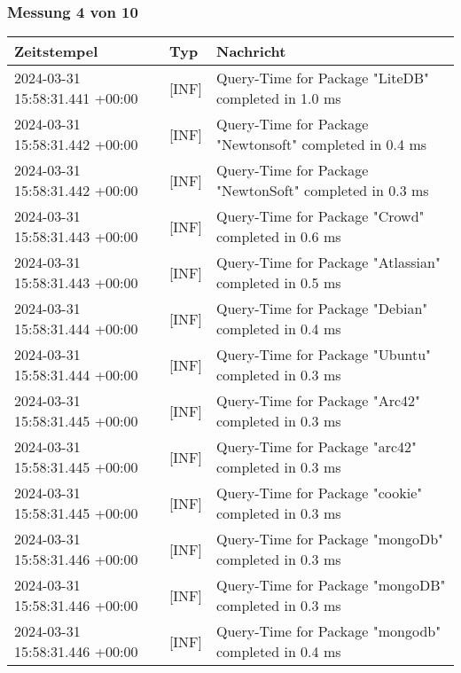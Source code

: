     \subsubsection*{Messung 4 von 10} \label{subsubsec:MySQLMitIndex4von10}
        {
            {\small
                \begin{tabularx}{\textwidth}{|l|l|X|}
                    \hline
                    \textbf{Zeitstempel} & \textbf{Typ} & \textbf{Nachricht} \\
                    \hline
                    \endhead
                    2024-03-31 15:58:31.441 +00:00 & [INF] & Query-Time for Package "LiteDB" completed in 1.0 ms \\
                    2024-03-31 15:58:31.442 +00:00 & [INF] & Query-Time for Package "Newtonsoft" completed in 0.4 ms \\
                    2024-03-31 15:58:31.442 +00:00 & [INF] & Query-Time for Package "NewtonSoft" completed in 0.3 ms \\
                    2024-03-31 15:58:31.443 +00:00 & [INF] & Query-Time for Package "Crowd" completed in 0.6 ms \\
                    2024-03-31 15:58:31.443 +00:00 & [INF] & Query-Time for Package "Atlassian" completed in 0.5 ms \\
                    2024-03-31 15:58:31.444 +00:00 & [INF] & Query-Time for Package "Debian" completed in 0.4 ms \\
                    2024-03-31 15:58:31.444 +00:00 & [INF] & Query-Time for Package "Ubuntu" completed in 0.3 ms \\
                    2024-03-31 15:58:31.445 +00:00 & [INF] & Query-Time for Package "Arc42" completed in 0.3 ms \\
                    2024-03-31 15:58:31.445 +00:00 & [INF] & Query-Time for Package "arc42" completed in 0.3 ms \\
                    2024-03-31 15:58:31.445 +00:00 & [INF] & Query-Time for Package "cookie" completed in 0.3 ms \\
                    2024-03-31 15:58:31.446 +00:00 & [INF] & Query-Time for Package "mongoDb" completed in 0.3 ms \\
                    2024-03-31 15:58:31.446 +00:00 & [INF] & Query-Time for Package "mongoDB" completed in 0.3 ms \\
                    2024-03-31 15:58:31.446 +00:00 & [INF] & Query-Time for Package "mongodb" completed in 0.4 ms \\

\end{tabularx}}}

